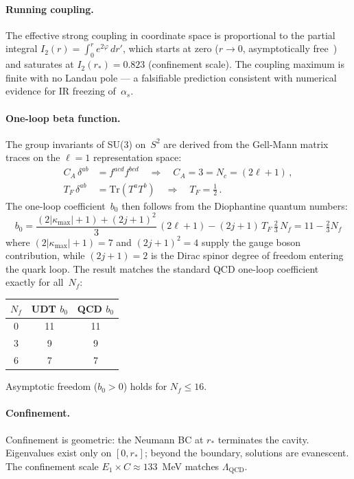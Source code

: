 \documentclass[aps,prd,twocolumn,superscriptaddress,nofootinbib,longbibliography]{revtex4-2}
\newcommand{\rstar}{r_{*}}
\newcommand{\kmax}{|\kappa_{\mathrm{max}}|}
\begin{document}
\paragraph{Running coupling.}  The effective strong coupling in
coordinate space is proportional to the partial integral
$I_2(r) = \int_0^r e^{2\varphi}\,dr'$, which starts at zero
($r \to 0$, asymptotically free~\cite{Gross1973,Politzer1973}) and
saturates at $I_2(\rstar) = 0.823$ (confinement scale).  The coupling
maximum is finite with no Landau pole --- a falsifiable prediction
consistent with numerical evidence for IR freezing of~$\alpha_s$.

\paragraph{One-loop beta function.}  The group invariants of SU(3)
on~$S^2$ are derived from the Gell-Mann matrix traces on the $\ell=1$
representation space:
\begin{align}
  C_A\,\delta^{ab} &= f^{acd}f^{bcd}
  \quad\Rightarrow\quad C_A = 3 = N_c = (2\ell+1)\,,\\
  T_F\,\delta^{ab} &= \mathrm{Tr}(T^a T^b)
  \quad\Rightarrow\quad T_F = \tfrac{1}{2}\,.
\end{align}
The one-loop coefficient~$b_0$ then follows from the Diophantine
quantum numbers:
\begin{equation}\label{eq:b0}
  \boxed{b_0 = \frac{(2\kmax+1)+(2j+1)^2}{3}\,(2\ell+1)
  - (2j+1)\,T_F\,\tfrac{2}{3}\,N_f
  = 11 - \tfrac{2}{3}N_f}
\end{equation}
where $(2\kmax+1) = 7$ and $(2j+1)^2 = 4$ supply the gauge boson
contribution, while $(2j+1) = 2$ is the Dirac spinor degree of freedom
entering the quark loop.  The result matches the standard QCD one-loop
coefficient exactly for all~$N_f$:
\begin{center}
\begin{tabular}{ccc}
\hline
$N_f$ & UDT $b_0$ & QCD $b_0$ \\
\hline
0 & 11 & 11 \\
3 & 9 & 9 \\
6 & 7 & 7 \\
\hline
\end{tabular}
\end{center}
Asymptotic freedom ($b_0 > 0$) holds for $N_f \leq 16$.

\paragraph{Confinement.}  Confinement is geometric: the Neumann BC at
$\rstar$ terminates the cavity.  Eigenvalues exist only on
$[0, \rstar]$; beyond the boundary, solutions are evanescent.  The
confinement scale $E_1 \times C \approx 133$~MeV matches
$\Lambda_\mathrm{QCD}$.
\end{document}
